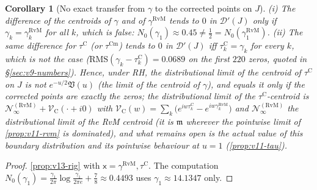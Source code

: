 \documentclass[11pt,a4paper]{article}
\numberwithin{equation}{section}
\newtheorem{corollary}[theorem]{Corollary}
\theoremstyle{definition}
\theoremstyle{remark}
\newcommand{\Cm}{\mathrm{Cm}}
\begin{document}
\begin{corollary}[No exact transfer from $\gamma$ to the corrected points on $J$]\label{cor:v13-notransfer}
(i) The difference of the centroids of $\gamma$ and of $\gamma^{\mathrm{RvM}}$ tends to $0$ in $\mathcal D'(J)$ only if $\gamma_k=\gamma_k^{\mathrm{RvM}}$ for all $k$, which is false: $N_0(\gamma_1)\approx0.45\ne\frac12=N_0(\gamma_1^{\mathrm{RvM}})$. (ii) The same difference for $\tau^{\mathrm C}$ (or $\tau^{\Cm}$) tends to $0$ in $\mathcal D'(J)$ iff $\tau_k^{\mathrm C}=\gamma_k$ for every $k$, which is not the case ($\mathrm{RMS}(\gamma_k-\tau_k^{\mathrm C})=0.0689$ on the first $220$ zeros, quoted in \S\ref{sec:v9-numbers}). Hence, \emph{under RH}, the distributional limit of the centroid of $\tau^{\mathrm C}$ on $J$ is \emph{not} $e^{-u/2}\mathfrak V(u)$ (the limit of the centroid of $\gamma$), and equals it only if the corrected points are exactly the zeros; the distributional limit of the $\tau^{\mathrm C}$-centroid is $\mathscr N_\infty^{(\mathrm{RvM})}+\mathscr V_{\mathrm C}(\cdot+i0)$ with $\mathscr V_{\mathrm C}(w)=\sum_k\bigl(e^{iw\tau_k^{\mathrm C}}-e^{iw\gamma_k^{\mathrm{RvM}}}\bigr)$ and $\mathscr N_\infty^{(\mathrm{RvM})}$ the distributional limit of the RvM centroid (it is $\mathfrak m$ wherever the pointwise limit of \cref{prop:v11-rvm} is dominated), and what remains open is the actual value of this boundary distribution and its pointwise behaviour at $u=1$ (\cref{prop:v11-tau}).
\end{corollary}
\begin{proof}
\cref{prop:v13-rig} with $\mathsf x=\gamma^{\mathrm{RvM}},\tau^{\mathrm C}$. The computation $N_0(\gamma_1)=\frac{\gamma_1}{2\pi}\log\frac{\gamma_1}{2\pi e}+\frac78\approx0.4493$ uses $\gamma_1\approx14.1347$ only.
\end{proof}
\end{document}
